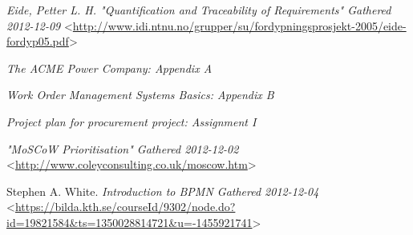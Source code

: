 \begin{thebibliography}{99}     
	

 \emph{Eide, Petter L. H. \textsl{"Quantiﬁcation and Traceability of Requirements"} Gathered 2012-12-09 } <\url{http://www.idi.ntnu.no/grupper/su/fordypningsprosjekt-2005/eide-fordyp05.pdf}>


 \emph{The ACME Power Company: Appendix A}

 \emph{Work Order Management Systems Basics: Appendix B}

 \emph{Project plan for procurement project: Assignment I}

 \emph{\textsl{"MoSCoW Prioritisation"} Gathered 2012-12-02} <\url{http://www.coleyconsulting.co.uk/moscow.htm}>

 Stephen A. White. \textsl{Introduction to BPMN Gathered 2012-12-04} <\url{https://bilda.kth.se/courseId/9302/node.do?id=19821584&ts=1350028814721&u=-1455921741}> 

\end{thebibliography}